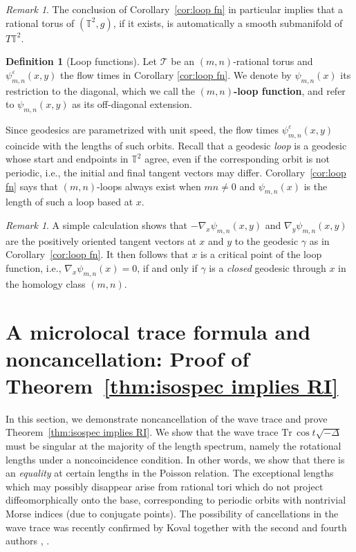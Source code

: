\documentclass[11pt,letterpaper,oneside]{amsart}
\newcommand{\T}{\mathbb{T}}
\theoremstyle{definition}
\newtheorem{def1}[theo]{Definition}
\theoremstyle{remark}
\newtheorem{rema}[theo]{Remark}
\newcommand{\eps}{\varepsilon}
\newcommand{\tr}{\text{Tr}\,}
\theoremstyle{definition}
\theoremstyle{remark}
\newtheorem*{remark}{Remark}
\newcommand{\CT}{\mathcal{T}}
\begin{document}
\begin{remark}
    The conclusion of Corollary~\ref{cor:loop fn} in particular implies that a rational torus of $(\T^2, g)$, if it exists, is automatically a smooth submanifold of $T\T^2$.
\end{remark}


\begin{def1}[Loop functions]\label{def:loop functions}
    Let $\CT$ be an $(m,n)$-rational torus and $\psi_{m,n}^\eps(x,y)$ the flow times in Corollary \ref{cor:loop fn}. We denote by $\psi_{m,n}(x)$ its restriction to the diagonal, which we call the \textbf{$(m,n)$-loop function}, and refer to $\psi_{m,n}(x,y)$ as its off-diagonal extension.
\end{def1}

Since geodesics are parametrized with unit speed, the flow times $\psi_{m,n}^\eps(x,y)$ coincide with the lengths of such orbits. Recall that a geodesic \textit{loop} is a geodesic whose start and endpoints in $\T^2$ agree, even if the corresponding orbit is not periodic, i.e., the initial and final tangent vectors may differ. Corollary~\ref{cor:loop fn} says that $(m,n)$-loops always exist when $mn \neq 0$ and $\psi_{m,n}(x)$ is the length of such a loop based at $x$.


\begin{rema}
    A simple calculation shows that $-\nabla_x \psi_{m,n}(x,y)$ and $\nabla_y \psi_{m,n}(x,y)$ are the positively oriented tangent vectors at $x$ and $y$ to the geodesic $\gamma$ as in Corollary~\ref{cor:loop fn}. It then follows that $x$ is a critical point of the loop function, i.e., $\nabla_x \psi_{m,n}(x) = 0$, if and only if $\gamma$ is a \textit{closed} geodesic through $x$ in the homology class $(m,n)$.
\end{rema}



\section{A microlocal trace formula and noncancellation: Proof of Theorem~\ref{thm:isospec implies RI}} \label{sec:trace}

In this section, we demonstrate noncancellation of the wave trace and prove Theorem~\ref{thm:isospec implies RI}. We show that the wave trace $\tr \cos t \sqrt{-\Delta}$ must be singular at the majority of the length spectrum, namely the rotational lengths under a noncoincidence condition. In other words, we show that there is an \textit{equality} at certain lengths in the Poisson relation. The exceptional lengths which may possibly disappear arise from rational tori which do not project diffeomorphically onto the base, corresponding to periodic orbits with nontrivial Morse indices (due to conjugate points). The possibility of cancellations in the wave trace was recently confirmed by Koval together with the second and fourth authors \cite{KKV}, \cite{KV24}.
\end{document}
